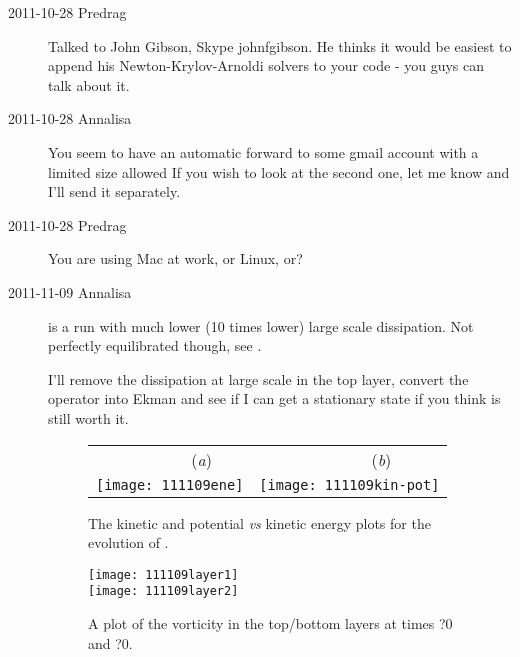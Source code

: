 \begin{description}
\item[2011-10-28 Predrag] Talked to John Gibson, Skype johnfgibson. He
thinks it would be easiest to append his Newton-Krylov-Arnoldi solvers to
your code - you guys can talk about it.

\item[2011-10-28 Annalisa]
You seem to have an automatic forward to some gmail account with a
limited size allowed If you wish to look at the second one, let me know
and I'll send it separately.

\item[2011-10-28 Predrag] You are using Mac at work, or Linux, or?

\item[2011-11-09 Annalisa]
 is a run with much lower (10 times lower) large
scale dissipation. Not perfectly equilibrated though, see
. %

I'll remove the dissipation at large scale in the top layer, convert the
operator into Ekman and see if I can get a stationary state if you think
is still worth it.


\begin{figure}%
\begin{center}
 \begin{tabular}{cc}
        ~~~~~~~~(\textit{a})                        &   ~~~~~~~~(\textit{b}) \\
    \texttt{[image: 111109ene]}
    &
    \texttt{[image: 111109kin-pot]}
  \end{tabular}
\end{center}
\caption{
The kinetic and potential {\em vs} kinetic energy plots
for the evolution of .
        }
\label{f:111109kin-pot}
\end{figure}

\begin{figure}%
\begin{center}
    \texttt{[image: 111109layer1]}
    \\
    \texttt{[image: 111109layer2]}
\end{center}
\caption{
A plot of the vorticity in the top/bottom layers at times ?0 and ?0.
        }
\label{f:111109layer}
\end{figure}


\end{description}
